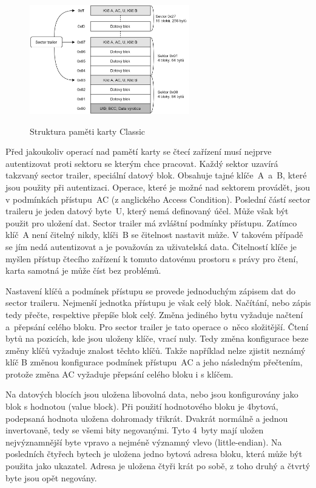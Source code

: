 \begin{figure}[ht]\centering
  \centering
  \hspace*{-0.07\linewidth}
  \includegraphics[width=0.6\linewidth,height=180px]{obrazky-figures/MemoryStructure.png}\\[1pt]  
  \caption{Struktura paměti karty Classic\cite{PracticalAttackOnMifare}}    
  \label{obrazekStrukturaPametiKarty}
\end{figure}

\par
Před jakoukoliv operací nad pamětí karty se čtecí zařízení musí nejprve autentizovat proti sektoru se kterým chce pracovat. Každý sektor uzavírá takzvaný sector trailer, speciální datový blok. Obsahuje tajné klíče~A~a~B, které jsou použity při autentizaci. Operace, které je možné nad sektorem provádět, jsou v podmínkách přístupu~AC (z anglického Access Condition). Poslední částí sector traileru je jeden datový byte~U, který nemá definovaný účel. Může však být použit pro uložení dat. Sector trailer má zvláštní  podmínky přístupu. Zatímco klíč~A není čitelný nikdy, klíči~B se čitelnost nastavit může. V takovém případě se jím nedá autentizovat a je považován za uživatelská data. Čitelností klíče je myšlen přístup čtecího zařízení k tomuto datovému prostoru s právy pro čtení, karta samotná je může číst bez problémů\cite{PracticalAttackOnMifare}. \par
Nastavení klíčů a podmínek přístupu se provede jednoduchým zápisem dat do sector traileru. Nejmenší jednotka přístupu je však celý blok. Načítání, nebo zápis tedy přečte, respektive přepíše blok celý. Změna jediného bytu vyžaduje načtení a~přepsání celého bloku. Pro sector trailer je tato operace o~něco složitější. Čtení bytů na pozicích, kde jsou uloženy klíče, vrací nuly. Tedy změna konfigurace beze změny klíčů vyžaduje znalost těchto klíčů. Takže například nelze zjistit neznámý klíč B změnou konfigurace podmínek přístupu~AC a jeho následným přečtením, protože změna AC vyžaduje přepsání celého bloku i s klíčem\cite{makingTheBestOf}.
\par
Na datových blocích jsou uložena libovolná data, nebo jsou konfigurovány jako blok s hodnotou (value block). Při použití hodnotového bloku je 4bytová, podepsaná hodnota uložena dohromady třikrát. Dvakrát normálně a jednou invertovaně, tedy se všemi bity negovanými. Tyto 4~byty mají uložen nejvýznamnější byte vpravo a nejméně významný vlevo ({little-endian}). Na posledních čtyřech bytech je uložena jedno bytová adresa bloku, která může být použita jako ukazatel. Adresa je uložena čtyři krát po sobě, z toho druhý a čtvrtý byte jsou opět negovány\cite{PracticalAttackOnMifare}.

